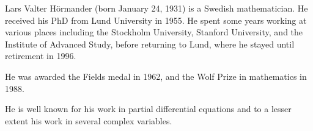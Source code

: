 \documentclass[12pt]{article}
\theoremstyle{theorem}
\theoremstyle{definition}
\theoremstyle{remark}
\begin{document}
Lars Valter H\"ormander (born January 24, 1931) is a Swedish mathematician.  He received his PhD from Lund University in 1955.  He spent some years working at various places including the Stockholm University, Stanford University, and
the Institute of Advanced Study, before returning to Lund, where he stayed until retirement in 1996.

He was awarded the Fields medal in 1962, and the Wolf Prize in mathematics in 1988.

He is well known for his work in partial differential equations and to a lesser extent his work in several complex variables.
\end{document}
